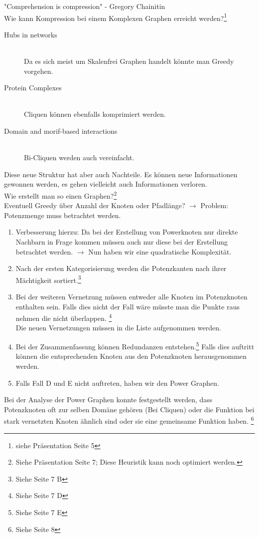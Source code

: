 \documentclass{article}
\begin{document}
"Comprehension is compression" - Gregory Chainitin 
\\

Wie kann Kompression bei einem Komplexen Graphen erreicht werden?\footnote{siehe Präsentation Seite 5}
\begin{description}
  \item[Hubs in networks]\hfill\\ Da es sich meist um Skalenfrei Graphen handelt könnte man Greedy vorgehen.
  \item[Protein Complexes]\hfill\\ Cliquen können ebenfalls komprimiert werden.
  \item[Domain and morif-based interactions]\hfill\\ Bi-Cliquen werden auch vereinfacht.
\end{description}

Diese neue Struktur hat aber auch Nachteile. Es können neue Informationen gewonnen werden, es gehen vielleicht auch
Informationen verloren.
\\

Wie erstellt man so einen Graphen?\footnote{Siehe Präsentation Seite 7; Diese Heuristik kann noch optimiert werden.}\\
Eventuell Greedy über Anzahl der Knoten oder Pfadlänge? $\rightarrow$ Problem: Potenzmenge muss betrachtet werden.\\
\begin{enumerate}
  \item Verbesserung hierzu: Da bei der Erstellung von Powerknoten nur direkte Nachbarn in Frage kommen müssen
        auch nur diese bei der Erstellung betrachtet werden. $\rightarrow$ Nun haben wir eine quadratische Komplexität.\\
  \item Nach der ersten Kategorisierung werden die Potenzkanten nach ihrer Mächtigkeit sortiert.\footnote{Siehe Seite 7 B}
  \item Bei der weiteren Vernetzung müssen entweder alle Knoten im Potenzknoten enthalten sein. Falls dies nicht der
        Fall wäre müsste man die Punkte raus nehmen die nicht überlappen. \footnote{Siehe Seite 7 D}\\
        Die neuen Vernetzungen müssen in die Liste aufgenommen werden.
  \item Bei der Zusammenfassung können Redundanzen entstehen.\footnote{Siehe Seite 7 E} Falls dies auftritt können die
        entsprechenden Knoten aus den Potenzknoten herausgenommen werden.
  \item Falls Fall D und E nicht auftreten, haben wir den Power Graphen.
\end{enumerate}
Bei der Analyse der Power Graphen konnte festgestellt werden, dass Potenzknoten oft zur selben Domäne gehören
(Bei Cliquen) oder die Funktion bei stark vernetzten Knoten ähnlich sind oder sie eine gemeinsame Funktion haben.
\footnote{Siehe Seite 8} 
\end{document}
